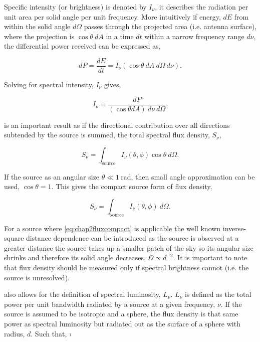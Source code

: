 Specific intensity (or brightness) is denoted by $I_\nu$, it describes the radiation per unit area per solid angle per unit frequency. More intuitively if energy, $dE$ from within the solid angle $d\Omega$ passes through the projected area (i.e. antenna surface), where the projection is $\cos \theta ~ dA$ in a time $dt$ within a narrow frequency range $d\nu$, the differential power received can be expressed as, 

\begin{equation}
    dP = \frac{dE}{dt} = I_\nu (\cos \theta ~ d A ~ d \Omega ~ d \nu). 
\end{equation}

Solving for spectral intensity, $I_\nu$ gives, 

\begin{equation}
    I_\nu = \frac{dP}{(\cos \theta d A) ~ d\nu ~ d\Omega}.
    \label{eq:spectral_intensity}
\end{equation}

 is an important result as if the directional contribution over all directions subtended by the source is summed, the total spectral flux density, $S_\nu$,

\begin{equation}
    S_\nu = \int_{\text{source}} I_\nu (\theta, \phi) \cos \theta ~ d\Omega. 
\end{equation}

If the source as an angular size $\theta \ll 1 ~\text{rad}$, then small angle approximation can be used, $\cos \theta = 1$. This gives the compact source form of flux density, 

\begin{equation}
    \boxed{
    S_\nu = \int_{\text{source}} I_\nu (\theta, \phi) ~ d\Omega. 
    }
    \label{eq:chap2fluxcompact}
\end{equation}

For a source where \cref{eq:chap2fluxcompact} is applicable the well known inverse-square distance dependence can be introduced as the source is observed at a greater distance the source takes up a smaller patch of the sky so its angular size shrinks and therefore its solid angle decreases, $\Omega \propto d^{-2}$. It is important to note that flux density should be measured only if spectral brightness cannot (i.e. the source is unresolved). 

 also allows for the definition of spectral luminosity, $L_\nu$. $L_\nu$ is defined as the total power per unit bandwidth radiated by a source at a given frequency, $\nu$. If the source is assumed to be isotropic and a sphere, the flux density is that same power as spectral luminosity but radiated out as the surface of a sphere with radius, $d$. Such that, ›

